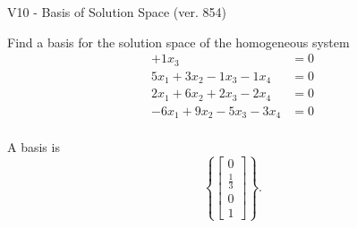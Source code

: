 \begin{exercise}
  \begin{exerciseTitle}V10 - Basis of Solution Space (ver. 854)\end{exerciseTitle}
  \begin{exerciseStatement}
    Find a basis for the solution space of the homogeneous system 
\begin{align*}
 + 1 x_ 3 &= 0  \\ 
  5 x_ 1 + 3 x_ 2 -1 x_ 3 -1 x_ 4 &= 0  \\ 
  2 x_ 1 + 6 x_ 2 + 2 x_ 3 -2 x_ 4 &= 0  \\ 
  -6 x_ 1 + 9 x_ 2 -5 x_ 3 -3 x_ 4 &= 0  \\ 
 \end{align*}


 
  \end{exerciseStatement}

  \begin{exerciseAnswer}
   A basis is   
\[\left\{\left[\begin{array}{c}
0 \\
\frac{1}{3} \\
0 \\
1
\end{array}\right]\right\}.\]

  


  \end{exerciseAnswer}
\end{exercise}